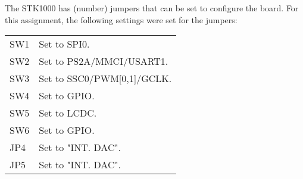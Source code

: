 The STK1000 has (number) jumpers that can be set to configure the board.
For this assignment, the following settings were set for the jumpers:

\begin{table}
\begin{tabular}{|l|l|}

SW1 &
Set to SPI0.
\\

SW2 &
Set to PS2A/MMCI/USART1.
\\

SW3 &
Set to SSC0/PWM[0,1]/GCLK.
\\

SW4 &
Set to GPIO.
\\

SW5 &
Set to LCDC.
\\

SW6 &
Set to GPIO.
\\

JP4 &
Set to "INT. DAC".
\\

JP5 &
Set to "INT. DAC".
\\

\end{tabular}
\end{table}
